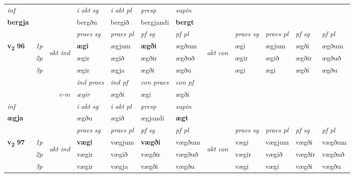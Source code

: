 \begin{longtable}[l]{X>{\footnotesize\itshape}llXXXXlXXXX}
   {\textit{inf}} & &  & \textit{i akt sg} & \textit{i akt pl}   & \textit{presp} & \textit{supin}   \\*
  {\textbf{bergja}} & && bergðu  & bergið   & bergjandi &  \textbf{bergt}   \\*

\midrule

 \midrule
 & &   & \textit{praes sg}  & \textit{praes pl}    & \textit{ pf sg} & \textit{pf pl} & & \textit{praes sg}  & \textit{praes pl}    & \textit{pf sg} & \textit{pf pl }  \\ \cmidrule{4-7} \cmidrule{9-12}
 \multirow{2}{*}{{{\textbf{v{\textsubscript{2}}} \Large{\textbf{96}}}}}  & 1p & \multirow{3}{*}{\begin{turn}{90}\textit{akt ind}\end{turn}} & \textbf{ægi} & ægjum & \textbf{ægði} & ægðum & \multirow{3}{*}{\begin{turn}{90}\textit{akt con}\end{turn}} &ægi & ægjum & ægði & ægðum\\*
 & 2p &  &  ægir  & ægið & ægðir & ægðuð & & ægir & ægið & ægðir & ægðuð \\*
 & 3p &  & ægir & ægja & ægði & ægðu & & ægi & ægi& ægði & ægðu \\*
\cmidrule{4-7} \cmidrule{9-12}

   && &  \textit{ind praes} & \textit{ind pf} & \textit{con praes} & \textit{con pf} \\*
\multicolumn{3}{r}{\textit{e-m}} & ægir & ægði & ægi & ægði \\*

\cmidrule{4-7}
   {\textit{inf}} & &  & \textit{i akt sg} & \textit{i akt pl}   & \textit{presp} & \textit{supin}   \\*
  {\textbf{ægja}} & && ægðu  & ægið   & ægjandi &  \textbf{ægt}   \\*

\midrule

 & &   & \textit{praes sg}  & \textit{praes pl}    & \textit{ pf sg} & \textit{pf pl} & & \textit{praes sg}  & \textit{praes pl}    & \textit{pf sg} & \textit{pf pl }  \\ \cmidrule{4-7} \cmidrule{9-12}
 \multirow{2}{*}{{{\textbf{v{\textsubscript{2}}} \Large{\textbf{97}}}}}  & 1p & \multirow{3}{*}{\begin{turn}{90}\textit{akt ind}\end{turn}} & \textbf{vægi} & vægjum & \textbf{vægði} & vægðum & \multirow{3}{*}{\begin{turn}{90}\textit{akt con}\end{turn}} &vægi & vægjum & vægði & vægðum\\*
 & 2p &  &  vægir  & vægið & vægðir & vægðuð & & vægir & vægið & vægðir & vægðuð \\*
 & 3p &  & vægir & vægja & vægði & vægðu & & vægi & vægi& vægði & vægðu \\*
\cmidrule{4-7} \cmidrule{9-12}


\end{longtable}
